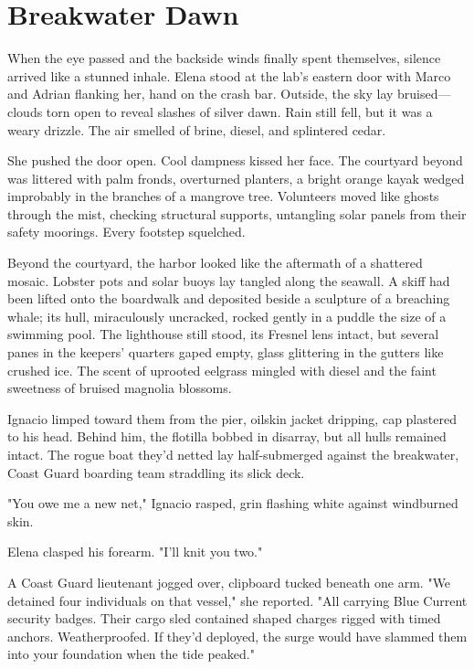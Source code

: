 \chapter{Breakwater Dawn}

When the eye passed and the backside winds finally spent themselves, silence arrived like a stunned inhale. Elena stood at the lab's eastern door with Marco and Adrian flanking her, hand on the crash bar. Outside, the sky lay bruised—clouds torn open to reveal slashes of silver dawn. Rain still fell, but it was a weary drizzle. The air smelled of brine, diesel, and splintered cedar.

She pushed the door open. Cool dampness kissed her face. The courtyard beyond was littered with palm fronds, overturned planters, a bright orange kayak wedged improbably in the branches of a mangrove tree. Volunteers moved like ghosts through the mist, checking structural supports, untangling solar panels from their safety moorings. Every footstep squelched.

Beyond the courtyard, the harbor looked like the aftermath of a shattered mosaic. Lobster pots and solar buoys lay tangled along the seawall. A skiff had been lifted onto the boardwalk and deposited beside a sculpture of a breaching whale; its hull, miraculously uncracked, rocked gently in a puddle the size of a swimming pool. The lighthouse still stood, its Fresnel lens intact, but several panes in the keepers' quarters gaped empty, glass glittering in the gutters like crushed ice. The scent of uprooted eelgrass mingled with diesel and the faint sweetness of bruised magnolia blossoms.

Ignacio limped toward them from the pier, oilskin jacket dripping, cap plastered to his head. Behind him, the flotilla bobbed in disarray, but all hulls remained intact. The rogue boat they'd netted lay half-submerged against the breakwater, Coast Guard boarding team straddling its slick deck.

"You owe me a new net," Ignacio rasped, grin flashing white against windburned skin.

Elena clasped his forearm. "I'll knit you two."

A Coast Guard lieutenant jogged over, clipboard tucked beneath one arm. "We detained four individuals on that vessel," she reported. "All carrying Blue Current security badges. Their cargo sled contained shaped charges rigged with timed anchors. Weatherproofed. If they'd deployed, the surge would have slammed them into your foundation when the tide peaked."

